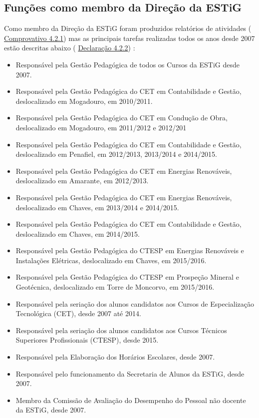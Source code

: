 \documentclass[11pt]{article}
\begin{document}
\subsection{Funções como membro da Direção da ESTiG}Como membro da Direção da ESTiG foram produzidos relatórios de atividades (
\href{run:MissaoIPBCargos/RelActividadesMJ.pdf}{Comprovativo 4.2.1}) mas as principais tarefas realizadas todos os anos desde 2007 estão descritas abaixo (
\href{run:MissaoIPBCargos/tarefasSub.pdf}{Declaração 4.2.2}) :
\begin{itemize}
\item{Responsável pela Gestão Pedagógica de todos os Cursos da ESTiG desde 2007.}
\item{Responsável pela Gestão Pedagógica do CET em Contabilidade e Gestão, deslocalizado em Mogadouro, em 2010/2011.}
\item{Responsável pela Gestão Pedagógica do CET em Condução de Obra, deslocalizado em Mogadouro, em 2011/2012 e 2012/201}
\item{Responsável pela Gestão Pedagógica do CET em Contabilidade e Gestão, deslocalizado em Penafiel, em 2012/2013, 2013/2014 e 2014/2015.}
\item{Responsável pela Gestão Pedagógica do CET em Energias Renováveis, deslocalizado em Amarante, em 2012/2013.}
\item{Responsável pela Gestão Pedagógica do CET em Energias Renováveis, deslocalizado em Chaves, em 2013/2014 e 2014/2015.}
\item{Responsável pela Gestão Pedagógica do CET em Contabilidade e Gestão, deslocalizado em Chaves, em 2014/2015.}
\item{Responsável pela Gestão Pedagógica do CTESP em Energias Renováveis e Instalações Elétricas, deslocalizado em Chaves, em 2015/2016.}
\item{Responsável pela Gestão Pedagógica do CTESP em Prospeção Mineral e Geotécnica, deslocalizado em Torre de Moncorvo, em 2015/2016.}
\item{Responsável pela seriação dos alunos candidatos aos Cursos de Especialização Tecnológica (CET), desde 2007 até 2014.}
\item{Responsável pela seriação dos alunos candidatos aos Cursos Técnicos Superiores Profissionais (CTESP), desde 2015. }
\item{Responsável pela Elaboração dos Horários Escolares, desde 2007. }
\item{Responsável pelo funcionamento da Secretaria de Alunos da ESTiG, desde 2007. }
\item{Membro da Comissão de Avaliação do Desempenho do Pessoal não docente da ESTiG, desde 2007. }

\end{itemize}
\end{document}
